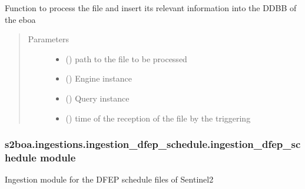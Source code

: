 \begin{fulllineitems}
\label{\detokenize{s2boa.ingestions:s2boa.ingestions.ingestion_dfep_acquisition.ingestion_dfep_acquisition.process_file}}
Function to process the file and insert its relevant information
into the DDBB of the eboa
\begin{quote}\begin{description}
\item[{Parameters}] \leavevmode\begin{itemize}
\item {} 
 () \textendash{} path to the file to be processed

\item {} 
 () \textendash{} Engine instance

\item {} 
 () \textendash{} Query instance

\item {} 
 () \textendash{} time of the reception of the file by the triggering

\end{itemize}

\end{description}\end{quote}

\end{fulllineitems}



\subsubsection{s2boa.ingestions.ingestion\_dfep\_schedule.ingestion\_dfep\_schedule module}
\label{\detokenize{s2boa.ingestions:module-s2boa.ingestions.ingestion_dfep_schedule.ingestion_dfep_schedule}}\label{\detokenize{s2boa.ingestions:s2boa-ingestions-ingestion-dfep-schedule-ingestion-dfep-schedule-module}}
Ingestion module for the DFEP schedule files of Sentinel\sphinxhyphen{}2

